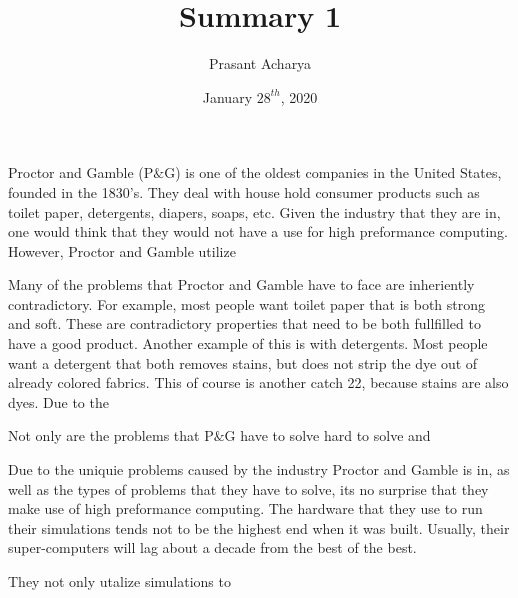 \documentclass{article}
\title{Summary 1}
\author{Prasant Acharya}
\date{January $28^{th}$, 2020}
\begin{document}
\maketitle
Proctor and Gamble (P$\&$G) is one of the oldest companies in the United States, founded in the 1830's. They deal with house hold consumer products such as toilet paper, detergents, diapers, soaps, etc. Given the industry that they are in, one would think that they would not have a use for high preformance computing. However, Proctor and Gamble utilize \par
Many of the problems that Proctor and Gamble have to face are inheriently contradictory. For example, most people want toilet paper that is both strong and soft. These are contradictory properties that need to be both fullfilled to have a good product. Another example of this is with detergents. Most people want a detergent that both removes stains, but does not strip the dye out of already colored fabrics. This of course is another catch 22, because stains are also dyes. Due to the \par
Not only are the problems that P$\&$G have to solve hard to solve and \par
Due to the uniquie problems caused by the industry Proctor and Gamble is in, as well as the types of problems that they have to solve, its no surprise that they make use of high preformance computing. The hardware that they use to run their simulations tends not to be the highest end when it was built. Usually, their super-computers will lag about a decade from the best of the best.\par
They not only utalize simulations to
\end{document}
